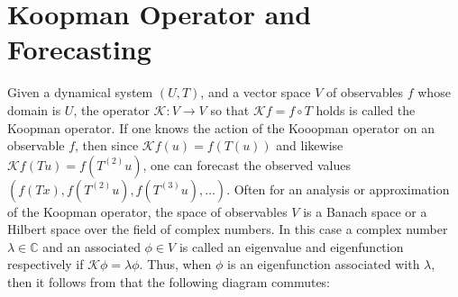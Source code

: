 \documentclass[12 pt]{article}
\begin{document}



\date{}
\date{}
\maketitle




\section{Koopman Operator and Forecasting} \label{Sec_Koopman}

Given a dynamical system $(U,T)$, and a vector space $V$ of observables $f$ whose domain is $U$, the operator $\mathcal{K}: V \to V$ so that 
$\mathcal{K} f = f \circ T$ holds is called the Koopman operator.  If one knows the action of the Kooopman operator on an observable $f$, then since 
$\mathcal{K} f(u) = f(T(u))$ and likewise $\mathcal{K} f(Tu) = f(T^{(2)}u)$, one can forecast the observed values $(f(Tx), f(T^{(2)}u), f(T^{(3)}u),\ldots)$. Often 
for an analysis or approximation of the Koopman operator, the space of observables $V$ is a Banach space or a Hilbert space over the field of complex numbers. In this case a complex number $\lambda \in \mathbb{C}$ and an associated $\phi \in V$ is called an eigenvalue and eigenfunction respectively if $\mathcal{K} \phi = \lambda \phi$. Thus, when $\phi$ is an eigenfunction associated with $\lambda$, then it follows from \cite{schmid2010dynamic,tu2013dynamic,williams2015data} that the following diagram commutes: 
\end{document}
